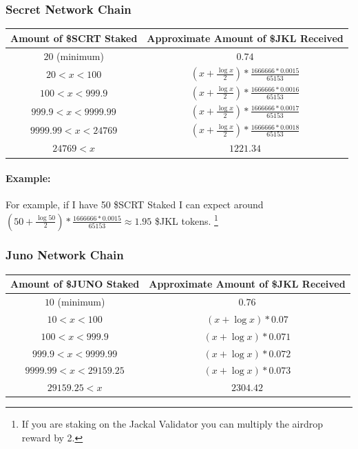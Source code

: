 \documentclass[11pt, nofootinbib]{article}
\begin{document}
\subsubsection{Secret Network Chain}
\begin{center}
\begin{tabular}{|c|c|}
\hline
\rowcolor{Black!80}
\color{White}Amount of \$SCRT Staked & \color{White}Approximate Amount of \$JKL Received \\
\hline
\hline
$20$ (minimum) & $0.74$ \\
\hline
\rowcolor{Black!10}
$20<x<100$ & ${(x+\frac{\log x}{2})*\frac{1666666*0.0015}{65153}}$ \\
\hline
$100<x<999.9$ & ${(x+\frac{\log x}{2})*\frac{1666666*0.0016}{65153}}$ \\
\hline
\rowcolor{Black!10}
$999.9<x<9999.99$ & ${(x+\frac{\log x}{2})*\frac{1666666*0.0017}{65153}}$\\
\hline
$9999.99<x<24769$ & ${(x+\frac{\log x}{2})*\frac{1666666*0.0018}{65153}}$ \\
\hline
\rowcolor{Black!10}
$24769<x$ & $1221.34$ \\
\hline
\end{tabular}
\end{center}

\paragraph{Example:}

For example, if I have 50 \$SCRT Staked I can expect around ${(50+\frac{\log 50}{2})*\frac{1666666*0.0015}{65153}} \approx1.95$ \$JKL tokens. \footnote[2]{If you are staking on the Jackal Validator you can multiply the airdrop reward by 2.}

\subsubsection{Juno Network Chain}
\begin{center}
\begin{tabular}{|c|c|}
\hline
\rowcolor{Black!80}
\color{White}Amount of \$JUNO Staked & \color{White}Approximate Amount of \$JKL Received \\
\hline
\hline
$10$ (minimum) & $0.76$ \\
\hline
\rowcolor{Black!10}
$10<x<100$ & ${(x+\log x)*0.07}$ \\
\hline
$100<x<999.9$ & ${(x+\log x)*0.071}$ \\
\hline
\rowcolor{Black!10}
$999.9<x<9999.99$ & ${(x+\log x)*0.072}$ \\
\hline
$9999.99<x<29159.25$ & ${(x+\log x)*0.073}$ \\
\hline
\rowcolor{Black!10}
$29159.25<x$ & $2304.42$ \\
\hline
\end{tabular}
\end{center}
\end{document}
